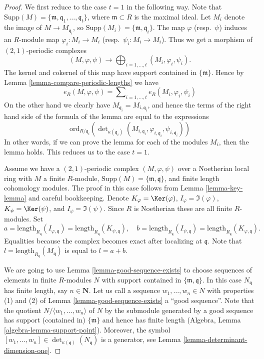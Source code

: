 \begin{proof}
We first reduce to the case $t = 1$ in the following way.
Note that
$\text{Supp}(M) = \{\mathfrak m, \mathfrak q_1, \ldots, \mathfrak q_t\}$,
where $\mathfrak m \subset R$ is the maximal ideal.
Let $M_i$ denote the image of $M \to M_{\mathfrak q_i}$,
so $\text{Supp}(M_i) = \{\mathfrak m, \mathfrak q_i\}$.
The map $\varphi$ (resp.\ $\psi$) induces an $R$-module map
$\varphi_i : M_i \to M_i$ (resp.\ $\psi_i : M_i \to M_i$).
Thus we get a morphism of $(2, 1)$-periodic complexes
$$
(M, \varphi, \psi) \longrightarrow
\bigoplus\nolimits_{i = 1, \ldots, t} (M_i, \varphi_i, \psi_i).
$$
The kernel and cokernel of this map have support contained in
$\{\mathfrak m\}$. Hence by Lemma \ref{lemma-compare-periodic-lengths}
we have
$$
e_R(M, \varphi, \psi) =
\sum\nolimits_{i = 1, \ldots, t}
e_R(M_i, \varphi_i, \psi_i)
$$
On the other hand we clearly have $M_{\mathfrak q_i} = M_{i, \mathfrak q_i}$,
and hence the terms of the right hand side of the formula of the
lemma are equal to the expressions
$$
\text{ord}_{R/\mathfrak q_i}\left(
\det\nolimits_{\kappa(\mathfrak q_i)}
(M_{i, \mathfrak q_i}, \varphi_{i, \mathfrak q_i}, \psi_{i, \mathfrak q_i})
\right)
$$
In other words, if we can prove the lemma for each of the modules
$M_i$, then the lemma holds. This reduces us to the case $t = 1$.

\medskip\noindent
Assume we have a $(2, 1)$-periodic complex $(M, \varphi, \psi)$
over a Noetherian local ring with $M$ a finite $R$-module,
$\text{Supp}(M) = \{\mathfrak m, \mathfrak q\}$, and
finite length cohomology modules. The proof in this case
follows from Lemma \ref{lemma-key-lemma} and careful bookkeeping.
Denote
$K_\varphi = \Ker(\varphi)$,
$I_\varphi = \Im(\varphi)$,
$K_\psi = \Ker(\psi)$, and
$I_\psi = \Im(\psi)$.
Since $R$ is Noetherian these are all finite $R$-modules.
Set
$$
a = \text{length}_{R_{\mathfrak q}}(I_{\varphi, \mathfrak q})
= \text{length}_{R_{\mathfrak q}}(K_{\psi, \mathfrak q}),
\quad
b = \text{length}_{R_{\mathfrak q}}(I_{\psi, \mathfrak q})
= \text{length}_{R_{\mathfrak q}}(K_{\varphi, \mathfrak q}).
$$
Equalities because the complex becomes exact after localizing at
$\mathfrak q$. Note that $l = \text{length}_{R_{\mathfrak q}}(M_{\mathfrak q})$
is equal to $l = a + b$.

\medskip\noindent
We are going to use Lemma \ref{lemma-good-sequence-exists}
to choose sequences of elements in finite $R$-modules
$N$ with support contained in $\{\mathfrak m, \mathfrak q\}$.
In this case $N_{\mathfrak q}$ has finite length, say $n \in \mathbf{N}$.
Let us call a sequence $w_1, \ldots, w_n \in N$
with properties (1) and (2) of Lemma \ref{lemma-good-sequence-exists}
a ``good sequence''. Note that the quotient
$N/\langle w_1, \ldots, w_n \rangle$ of $N$ by the submodule generated by
a good sequence has support (contained in) $\{\mathfrak m\}$
and hence has finite length (Algebra, Lemma \ref{algebra-lemma-support-point}).
Moreover, the symbol
$[w_1, \ldots, w_n] \in \det_{\kappa(\mathfrak q)}(N_{\mathfrak q})$
is a generator, see Lemma \ref{lemma-determinant-dimension-one}.


\end{proof}

